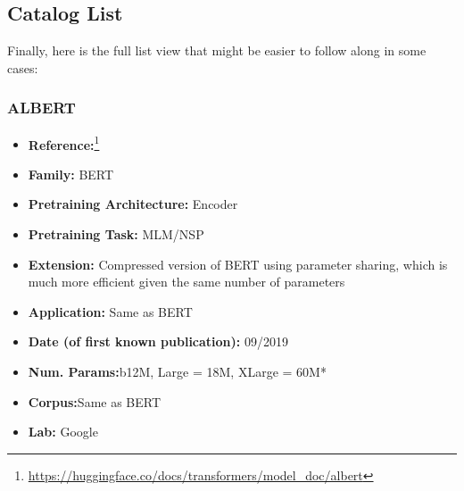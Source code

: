 \documentclass{article}
\begin{document}
\subsection{Catalog List}

Finally, here is the full list view that might be easier to follow along in some cases:

\subsubsection{ALBERT}
            \begin{itemize}
                \item \textbf{Reference:}\footnote{\url{https://huggingface.co/docs/transformers/model_doc/albert}}\cite{lan2019albert}
                \item \textbf{Family:} BERT
                \item \textbf{Pretraining Architecture:} Encoder
                \item \textbf{Pretraining Task:} MLM/NSP
                \item \textbf{Extension:} Compressed version of BERT using parameter sharing, which is much more efficient given the same number of parameters
                \item \textbf{Application:} Same as BERT
                \item \textbf{Date (of first known publication):} 09/2019
                \item \textbf{Num. Params:}b12M, Large = 18M, XLarge = 60M*
                \item \textbf{Corpus:}Same as BERT
                \item \textbf{Lab:} Google
            \end{itemize}
\end{document}
